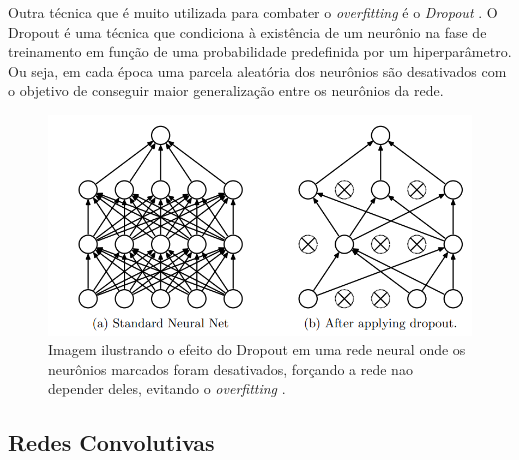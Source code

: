 
Outra técnica que é muito utilizada para combater o \textit{overfitting} é o \textit{Dropout} \cite{dropout2014}. O Dropout é uma técnica que condiciona à existência de um neurônio na fase de treinamento em função de uma probabilidade predefinida por um hiperparâmetro. Ou seja, em cada época uma parcela aleatória dos neurônios são desativados com o objetivo de conseguir maior generalização entre os neurônios da rede.

\begin{figure}[h]
	\centering
	\includegraphics[scale=0.4]{pasta1_figuras/dropout.png}
	\caption{Imagem ilustrando o efeito do Dropout em uma rede neural onde os neurônios marcados foram desativados, forçando a rede nao depender deles, evitando o \textit{overfitting} \cite{dropout2014}.}
	
	\label{fig-dropout}
\end{figure}

\subsection{Redes Convolutivas} \label{cnn}

